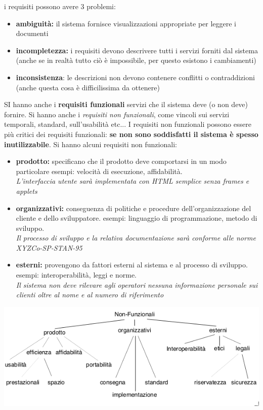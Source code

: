 \documentclass[a4paper,12pt, oneside]{book}
\begin{document}
i requisiti possono avere 3 problemi:
\begin{itemize}
\item \textbf{ambiguità:} il sistema fornisce visualizzazioni appropriate per leggere i documenti
\item \textbf{incompletezza:} i requisiti devono descrivere tutti i	servizi forniti dal sistema (anche se in realtà tutto ciò è impossibile, per questo esistono i cambiamenti)
\item \textbf{inconsistenza}: le descrizioni non devono contenere conflitti o contraddizioni (anche questa cosa è difficilissima da ottenere)
\end{itemize}
SI hanno anche i \textbf{requisiti funzionali} servizi che il sistema deve (o non deve) fornire. Si hanno anche i \textit{requisiti non funzionali}, come vincoli sui servizi temporali, standard, sull'usabilità etc... I requisiti non funzionali possono essere più critici dei requisiti funzionali: \textbf{se non sono soddisfatti il sistema è spesso inutilizzabile}. Si hanno alcuni requisiti non funzionali:
\begin{itemize}
\item \textbf{prodotto: }specificano che il prodotto deve comportarsi in un modo particolare
esempi: velocità di esecuzione, affidabilità.\\
\textit{L’interfaccia utente sarà implementata con HTML semplice senza frames
e applets}
\item \textbf{organizzativi: }conseguenza di politiche e procedure dell’organizzazione del cliente e dello sviluppatore.
esempi: linguaggio di programmazione, metodo di sviluppo.\\
\textit{Il processo di sviluppo e la relativa documentazione sarà conforme alle
norme XYZCo-SP-STAN-95}
\item \textbf{esterni: }provengono da fattori esterni al sistema e al processo di sviluppo.
esempi: interoperabilità, leggi e norme.
\\ \textit{Il sistema non deve rilevare agli operatori nessuna informazione
personale sui clienti oltre al nome e al numero di riferimento}
\end{itemize}
\begin{center}
\includegraphics[scale=0.8]{img/req.png}
\end{center}
\end{document}
